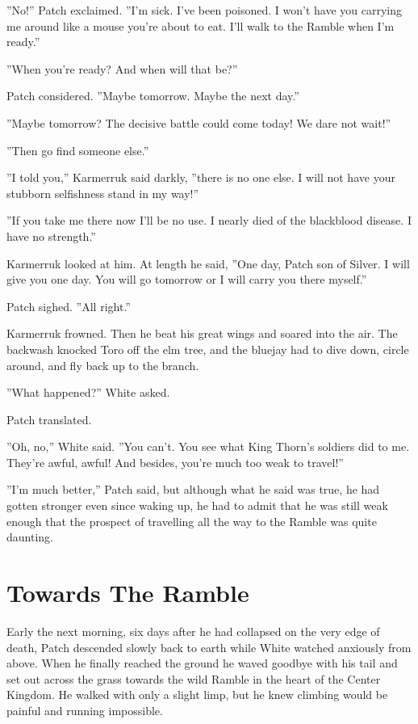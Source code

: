 \documentclass[12pt]{book}
\begin{document}
''No!'' Patch exclaimed. ''I'm sick. I've been poisoned. I won't have you carrying me around like a mouse you're about to eat. I'll walk to the Ramble when I'm ready.''

''When you're ready? And when will that be?''

Patch considered. ''Maybe tomorrow. Maybe the next day.''

''Maybe tomorrow? The decisive battle could come today! We dare not wait!''

''Then go find someone else.''

''I told you,'' Karmerruk said darkly, ''there is no one else. I will not have your stubborn selfishness stand in my way!''

''If you take me there now I'll be no use. I nearly died of the blackblood disease. I have no strength.''

Karmerruk looked at him. At length he said, ''One day, Patch son of Silver. I will give you one day. You will go tomorrow or I will carry you there myself.''

Patch sighed. ''All right.''

Karmerruk frowned. Then he beat his great wings and soared into the air. The backwash knocked Toro off the elm tree, and the bluejay had to dive down, circle around, and fly back up to the branch.

''What happened?'' White asked.

Patch translated.

''Oh, no,'' White said. ''You can't. You see what King Thorn's soldiers did to me. They're awful, awful! And besides, you're much too weak to travel!''

''I'm much better,'' Patch said, but although what he said was true, he had gotten stronger even since waking up, he had to admit that he was still weak enough that the prospect of travelling all the way to the Ramble was quite daunting.


\section{Towards The Ramble}

Early the next morning, six days after he had collapsed on the very edge of death, Patch descended slowly back to earth while White watched anxiously from above. When he finally reached the ground he waved goodbye with his tail and set out across the grass towards the wild Ramble in the heart of the Center Kingdom. He walked with only a slight limp, but he knew climbing would be painful and running impossible.
\end{document}
